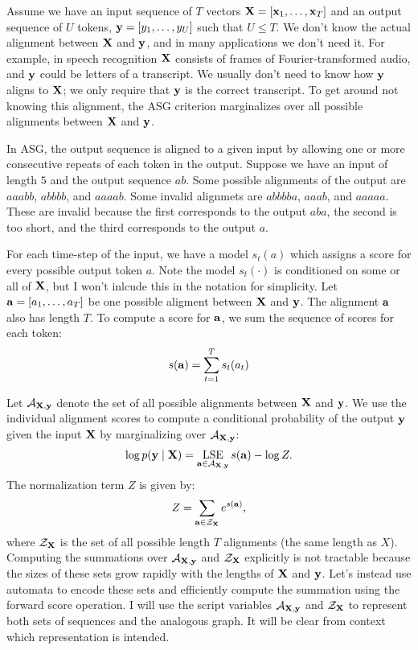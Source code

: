 Assume we have an input sequence of $T$ vectors ${\bf X} = [{\bf x}_1, \ldots, {\bf x}_T]$
and an output sequence of $U$ tokens, ${\bf y} = [y_1, \ldots, y_U]$ such that $U
\le T$. We don't know the actual alignment between ${\bf X}$ and ${\bf y}$, and in many
applications we don't need it. For example, in speech recognition ${\bf X}$
consists of frames of Fourier-transformed audio, and ${\bf y}$ could be letters of
a transcript. We usually don't need to know how ${\bf y}$ aligns to ${\bf X}$; we only
require that ${\bf y}$ is the correct transcript. To get around not knowing this
alignment, the ASG criterion marginalizes over all possible alignments between
${\bf X}$ and ${\bf y}$.

In ASG, the output sequence is aligned to a given input by allowing one or more
consecutive repeats of each token in the output. Suppose we have an input of
length $5$ and the output sequence $ab$. Some possible alignments of the output
are $aaabb$, $abbbb$, and $aaaab$. Some invalid alignmets are $abbbba$, $aaab$,
and $aaaaa$. These are invalid because the first corresponds to the output
$aba$, the second is too short, and the third corresponds to the output $a$.

For each time-step of the input, we have a model $s_t(a)$ which assigns a score
for every possible output token $a$. Note the model $s_t(\cdot)$ is conditioned
on some or all of ${\bf X}$, but I won't inlcude this in the notation for
simplicity. Let ${\bf a} = [a_1, \ldots, a_T]$ be one possible aligment between
${\bf X}$ and ${\bf y}$. The alignment ${\bf a}$ also has length $T$. To compute a score
for ${\bf a}$, we sum the sequence of scores for each token:
$$
s({\bf a}) = \sum_{t=1}^T s_t(a_t)
$$

Let $\mathcal{A}_{{\bf X},{\bf y}}$ denote the set of all possible alignments between ${\bf X}$ and
${\bf y}$. We use the individual alignment scores to compute a conditional
probability of the output ${\bf y}$ given the input ${\bf X}$ by marginalizing over
$\mathcal{A}_{{\bf X},{\bf y}}$:
$$
\log p({\bf y} \mid {\bf X}) = \operatorname*{\textrm{LSE}}_{{\bf a} \in \mathcal{A}_{{\bf X}, {\bf y}}} s({\bf a}) - \log Z.
$$
The normalization term $Z$ is given by:
$$
Z = \sum_{{\bf a} \in \mathcal{Z}_{\bf X}} e^{s({\bf a})},
$$
where $\mathcal{Z}_{\bf X}$ is the set of all possible length $T$ alignments (the same
length as $X$). Computing the summations over $\mathcal{A}_{{\bf X},{\bf y}}$ and $\mathcal{Z}_{\bf X}$
explicitly is not tractable because the sizes of these sets grow rapidly with
the lengths of ${\bf X}$ and ${\bf y}$. Let's instead use automata to encode these sets
and efficiently compute the summation using the forward score operation. I will
use the script variables $\mathcal{A}_{{\bf X},{\bf y}}$ and $\mathcal{Z}_{\bf X}$ to represent both sets
of sequences and the analogous graph. It will be clear from context which
representation is intended.

